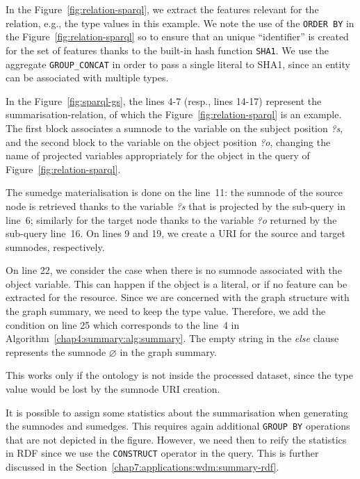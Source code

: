 
In the Figure~\ref{fig:relation-sparql}, we extract the features relevant for the relation, e.g., the type values in this example. We note the use of the \texttt{ORDER BY} in the Figure~\ref{fig:relation-sparql} so to ensure that an unique ``identifier'' is created for the set of features thanks to the built-in hash function \texttt{SHA1}. We use the aggregate \texttt{GROUP\_CONCAT} in order to pass a single literal to SHA1, since an entity can be associated with multiple types.


In the Figure~\ref{fig:sparql-gs}, the lines 4-7 (resp., lines 14-17) represent the \gls{summarisation-relation}, of which the Figure~\ref{fig:relation-sparql} is an example. The first block associates a sumnode to the variable on the subject position \emph{?s}, and the second block to the variable on the object position \emph{?o}, changing the name of projected variables appropriately for the object in the query of Figure~\ref{fig:relation-sparql}.

The sumedge materialisation is done on the line~11: the sumnode of the source node is retrieved thanks to the variable \emph{?s} that is projected by the sub-query in line~6; similarly for the target node thanks to the variable \emph{?o} returned by the sub-query line~16.
On lines 9 and 19, we create a URI for the source and target sumnodes, respectively.

On line 22, we consider the case when there is no sumnode associated with the object variable. This can happen if the object is a literal, or if no feature can be extracted for the resource. Since we are concerned with the graph structure with the graph summary, we need to keep the type value. Therefore, we add the condition on line 25 which corresponds to the line~4 in Algorithm~\ref{chap4:summary:alg:summary}.
The empty string in the \emph{else} clause represents the sumnode $\varnothing$ in the graph summary.

\begin{remark}
This works only if the ontology is not inside the processed dataset, since the type value would be lost by the sumnode URI creation.
\end{remark}


It is possible to assign some statistics about the summarisation when generating the sumnodes and sumedges. This requires again additional \texttt{GROUP BY} operations that are not depicted in the figure. However, we need then to reify the statistics in RDF since we use the \texttt{CONSTRUCT} operator in the query. This is further discussed in the Section~\ref{chap7:applications:wdm:summary-rdf}.

